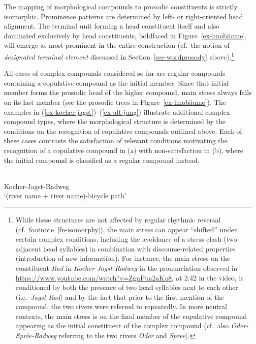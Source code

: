 \documentclass[output=paper
 ,nobabel
 ,draftmode
 ,colorlinks, citecolor=brown
]{langscibook}
\begin{document}
The mapping of morphological compounds to prosodic constituents is strictly isomorphic. Prominence patterns are determined by left- or right-oriented head alignment. The terminal unit forming a head constituent itself and also dominated exclusively by head constituents, boldfaced in Figure~\ref{ex-hnobäume}, will emerge as most prominent in the entire construction (cf.\ the notion of \emph{designated terminal element} discussed in Section~\ref{sec-wordprosody} above).\footnote{While these structures are not affected by regular rhythmic reversal (cf.\ footnote~\ref{fn-isomorphy}), the main stress can appear ``shifted'' under certain complex conditions, including the avoidance of a stress clash (two adjacent head syllables) in combination with discourse-related properties (introduction of new information). For instance, the main stress on the constituent \emph{Rad} in \emph{Kocher-Jagst-Radweg} in the pronunciation observed in \url{https://www.youtube.com/watch?v=ZgnPua2aKu8}, at 2:42 in the video, is conditioned by both the presence of two head syllables next to each other (i.e.\ \emph{Jagst-Rad}) and by the fact that prior to the first mention of the compound, the two rivers were referred to repeatedly. In more neutral contexts, the main stress is on the final member of the copulative compound appearing as the initial constituent of the complex compound
(cf.\ also \emph{Oder-Sprée-Radweg} referring to the two rivers \emph{Oder} and \emph{Spree}).} 


\largerpage[-1]
All cases of complex compounds considered so far are regular compounds containing a copulative compound as the initial member. Since that initial member forms the prosodic head of the higher compound, main stress always falls on its last member (see the prosodic trees in Figure~\ref{ex-hnobäume}). The examples in (\ref{ex-kocher-jagst})--(\ref{ex-alt-jung}) illustrate additional complex compound types, where the morphological structure is determined by the conditions on the recognition of copulative compounds outlined above. Each of these cases contrasts the satisfaction of relevant conditions motivating the recognition of a copulative compound in (a) with non-satisfaction in (b), where the initial compound is classified as a regular compound instead. 


\eal\label{ex-kocher-jagst}
\\
Kocher-Jagst-Radweg\\
`(river name + river name)-bicycle path'
\end{document}
